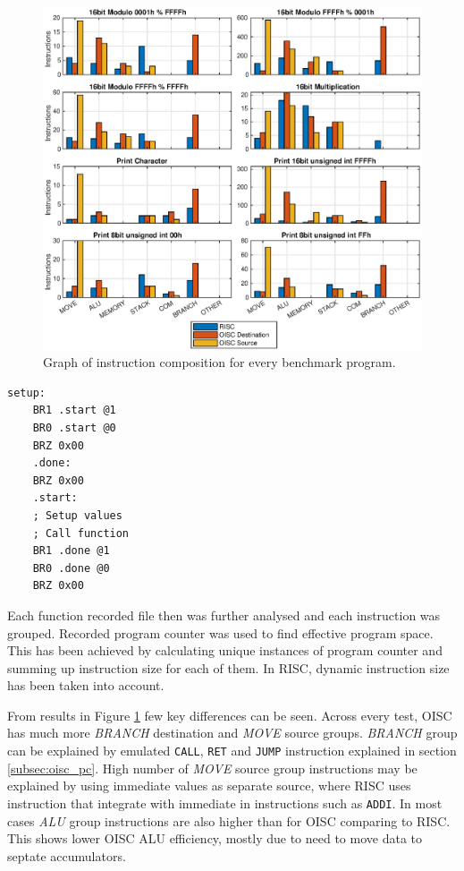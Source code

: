 \begin{figure}[ht!]
	\centering
	\includegraphics[width=\linewidth]{../tests/instr_comp.eps}
	\caption{Graph of instruction composition for every benchmark program.}
	\label{fig:instr_comp}
\end{figure}

\begin{blockpage}
	\begin{lstlisting}[frame=single, caption={OISC assembly frame for executring tests}, emph={setup,start,done} label=asm_oisc_test]
	setup:
	BR1 .start @1
	BR0 .start @0
	BRZ 0x00
	.done:
	BRZ 0x00
	.start:
	; Setup values
	; Call function
	BR1 .done @1
	BR0 .done @0
	BRZ 0x00
	\end{lstlisting}
\end{blockpage}

Each function recorded file then was further analysed and each instruction was grouped. Recorded program counter was used to find effective program space. This has been achieved by calculating unique instances of program counter and summing up instruction size for each of them. In RISC, dynamic instruction size has been taken into account. 

From results in Figure \ref{fig:instr_comp} few key differences can be seen. Across every test, OISC has much more \textit{BRANCH} destination and \textit{MOVE} source groups. \textit{BRANCH} group can be explained by emulated \texttt{CALL}, \texttt{RET} and \texttt{JUMP} instruction explained in section \ref{subsec:oisc_pc}.
High number of \textit{MOVE} source group instructions may be explained by using immediate values as separate source, where RISC uses instruction that integrate with immediate in instructions such as \texttt{ADDI}. In most cases \textit{ALU} group instructions are also higher than for OISC comparing to RISC. This shows lower OISC ALU efficiency, mostly due to need to move data to septate accumulators.

